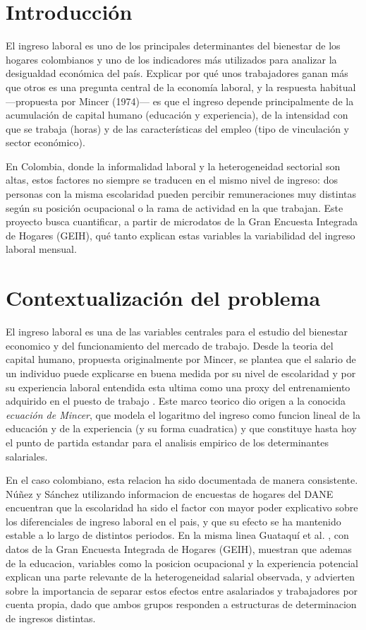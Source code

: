 \documentclass[
  spanish,
  letterpaper,
  DIV=11,
  numbers=noendperiod]{scrartcl}
\begin{document}
\section{Introducción}\label{introducciuxf3n}

El ingreso laboral es uno de los principales determinantes del bienestar
de los hogares colombianos y uno de los indicadores más utilizados para
analizar la desigualdad económica del país. Explicar por qué unos
trabajadores ganan más que otros es una pregunta central de la economía
laboral, y la respuesta habitual ---propuesta por Mincer (1974)--- es
que el ingreso depende principalmente de la acumulación de capital
humano (educación y experiencia), de la intensidad con que se trabaja
(horas) y de las características del empleo (tipo de vinculación y
sector económico).

En Colombia, donde la informalidad laboral y la heterogeneidad sectorial
son altas, estos factores no siempre se traducen en el mismo nivel de
ingreso: dos personas con la misma escolaridad pueden percibir
remuneraciones muy distintas según su posición ocupacional o la rama de
actividad en la que trabajan. Este proyecto busca cuantificar, a partir
de microdatos de la Gran Encuesta Integrada de Hogares (GEIH), qué tanto
explican estas variables la variabilidad del ingreso laboral mensual.

\section{Contextualización del problema}

El ingreso laboral es una de las variables centrales para el estudio del bienestar
economico y del funcionamiento del mercado de trabajo. Desde la teoria del capital
humano, propuesta originalmente por Mincer, se plantea que el salario de un
individuo puede explicarse en buena medida por su nivel de escolaridad y por su
experiencia laboral entendida esta ultima como una proxy del entrenamiento
adquirido en el puesto de trabajo \cite{mincer1974}. Este marco teorico dio origen
a la conocida \emph{ecuación de Mincer}, que modela el logaritmo del ingreso como
funcion lineal de la educación y de la experiencia (y su forma cuadratica) y que
constituye hasta hoy el punto de partida estandar para el analisis empirico de los
determinantes salariales.

En el caso colombiano, esta relacion ha sido documentada de manera consistente.
Núñez y Sánchez \cite{nunez1998} utilizando informacion de encuestas de hogares
del DANE encuentran que la escolaridad ha sido el factor con mayor poder
explicativo sobre los diferenciales de ingreso laboral en el pais, y que su efecto
se ha mantenido estable a lo largo de distintos periodos. En la misma linea
Guataquí et al. \cite{guataqui}, con datos de la Gran Encuesta Integrada de
Hogares (GEIH), muestran que ademas de la educacion, variables como la posicion
ocupacional y la experiencia potencial explican una parte relevante de la
heterogeneidad salarial observada, y advierten sobre la importancia de separar
estos efectos entre asalariados y trabajadores por cuenta propia, dado que ambos
grupos responden a estructuras de determinacion de ingresos distintas.
\end{document}
